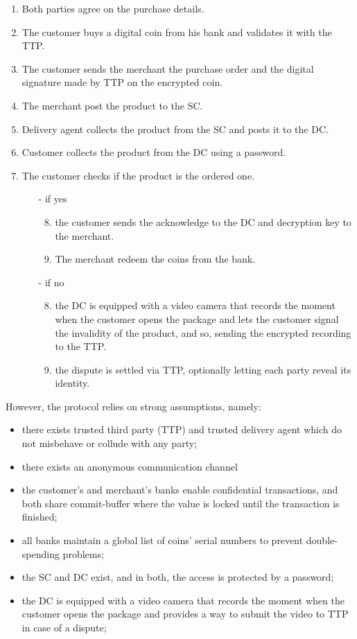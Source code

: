 \documentclass{ieeeaccess}
\begin{document}
\begin{enumerate}
    \item Both parties agree on the purchase details.
    \item The customer buys a digital coin from his bank and validates it with the TTP.
    \item The customer sends the merchant the purchase order and the digital signature made by TTP on the encrypted coin.
    \item The merchant post the product to the SC.
    \item Delivery agent collects the product from the SC and posts it to the DC.
    \item Customer collects the product from the DC using a password.
    \item The customer checks if the product is the ordered one.
    \begin{itemize}
    \item[-] if yes 
        \begin{enumerate}
        \setcounter{enumii}{7}
        \item the customer sends the acknowledge to the DC and decryption key to the merchant.
        \item The merchant redeem the coins from the bank.
        \end{enumerate}
    \item[-] if no
        \begin{enumerate}
        \setcounter{enumii}{7}
        \item the DC is equipped with a video camera that records the moment when the customer opens the package and lets the customer signal the invalidity of the product, and so, sending the encrypted recording to the TTP. 
        \item the dispute is settled via TTP, optionally letting each party reveal its identity.
    \end{enumerate}
    \end{itemize}
\end{enumerate}
\endgroup

However, the protocol relies on strong assumptions, namely:

\begin{itemize}
    \item there exists trusted third party (TTP) and trusted delivery agent which do not misbehave or collude with any party;
    \item there exists an anonymous communication channel 
    \item the customer's and merchant's banks enable confidential transactions, and both share commit-buffer where the value is locked until the transaction is finished;
    \item all banks maintain a global list of coins' serial numbers to prevent double-spending problems;
    \item the SC and DC exist, and in both, the access is protected by a password;
    \item the DC is equipped with a video camera that records the moment when the customer opens the package and provides a way to submit the video to TTP in case of a dispute;
\end{itemize}
\end{document}
